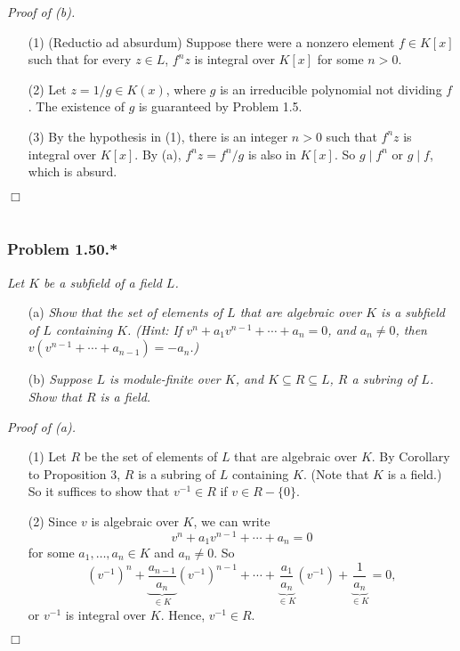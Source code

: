 \documentclass{article}
\begin{document}
\emph{Proof of (b).}
\begin{enumerate}
\item[(1)]
  (Reductio ad absurdum)
  Suppose there were a nonzero element $f \in K[x]$ such that for
  every $z \in L$, $f^n z$ is integral over $K[x]$ for some $n > 0$.

\item[(2)]
  Let $z = 1/g \in K(x)$, where $g$ is an irreducible polynomial not dividing $f$.
  The existence of $g$ is guaranteed by Problem 1.5.

\item[(3)]
  By the hypothesis in (1), there is an integer $n > 0$ such that
  $f^n z$ is integral over $K[x]$.
  By (a), $f^n z = f^n/g$ is also in $K[x]$. So $g \mid f^n$ or $g \mid f$,
  which is absurd.
\end{enumerate}
$\Box$ \\\\






\subsubsection*{Problem 1.50.*}
\emph{Let $K$ be a subfield of a field $L$.}
\begin{enumerate}
\item[(a)]
  \emph{Show that the set of elements of $L$ that are
  algebraic over $K$ is a subfield of $L$ containing $K$.
  (Hint: If $v^n + a_1 v^{n-1} + \cdots + a_n = 0$, and $a_n \neq 0$,
  then $v(v^{n-1} + \cdots + a_{n-1}) = -a_n$.)}

\item[(b)]
  \emph{Suppose $L$ is module-finite over $K$, and $K \subseteq R \subseteq L$, $R$ a subring of $L$.
  Show that $R$ is a field.} \\
\end{enumerate}



\emph{Proof of (a).}
\begin{enumerate}
\item[(1)]
  Let $R$ be the set of elements of $L$ that are algebraic over $K$.
  By Corollary to Proposition 3, $R$ is a subring of $L$ containing $K$.
  (Note that $K$ is a field.)
  So it suffices to show that $v^{-1} \in R$ if $v \in R - \{0\}$.

\item[(2)]
  Since $v$ is algebraic over $K$,
  we can write
  \[
    v^n + a_1 v^{n-1} + \cdots + a_n = 0
  \]
  for some $a_1, \ldots, a_n \in K$ and $a_n \neq 0$.
  So
  \[
    \left(v^{-1}\right)^n
      + \underbrace{\frac{a_{n-1}}{a_n}}_{\in K} \left(v^{-1}\right)^{n-1}
      + \cdots
      + \underbrace{\frac{a_1}{a_n}}_{\in K} \left(v^{-1}\right)
      + \underbrace{\frac{1}{a_n}}_{\in K} = 0,
  \]
  or $v^{-1}$ is integral over $K$. Hence, $v^{-1} \in R$.
\end{enumerate}
$\Box$ \\
\end{document}
